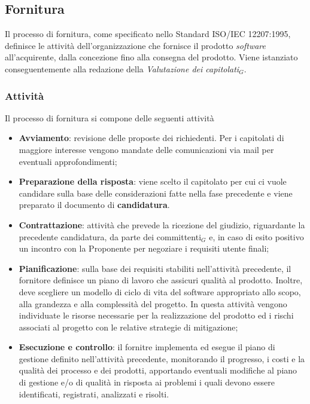 \documentclass[10pt, letterpaper]{article}
\begin{document}
\subsection{Fornitura}
Il processo di fornitura, come specificato nello Standard ISO/IEC 12207:1995, definisce le attività dell'organizzazione che fornisce il prodotto \textit{software} all'acquirente, dalla concezione fino alla consegna del prodotto. Viene istanziato conseguentemente alla redazione della \textit{Valutazione dei \textit{capitolati$_{G}$}}.

\subsubsection{Attività}
Il processo di fornitura si compone delle seguenti attività
\begin{itemize}
    \item \textbf{Avviamento}: revisione delle proposte dei richiedenti. Per i capitolati di maggiore interesse vengono mandate delle comunicazioni via mail per eventuali approfondimenti;

    \item \textbf{Preparazione della risposta}: viene scelto il capitolato per cui ci vuole candidare sulla base delle considerazioni fatte nella fase precedente e viene preparato il documento di \textbf{candidatura}.
    
    \item \textbf{Contrattazione}: attività che prevede la ricezione del giudizio, riguardante la precedente candidatura, da parte dei committenti$_{G}$ e, in 
    caso di esito positivo un incontro con la Proponente per negoziare i requisiti utente finali;
    
    \item \textbf{Pianificazione}: sulla base dei requisiti stabiliti nell'attività precedente, il fornitore definisce un piano di lavoro che assicuri qualità al prodotto. Inoltre, deve scegliere un modello di ciclo di vita del software appropriato allo scopo, alla grandezza e alla complessità del progetto. In questa attività vengono individuate le risorse necessarie per la realizzazione del prodotto ed i rischi associati al progetto con le relative strategie di mitigazione;
    
    \item \textbf{Esecuzione e controllo}: il fornitre implementa ed esegue il piano di gestione definito nell'attività precedente, monitorando il progresso, i costi e la qualità dei processo e dei prodotti, apportando eventuali modifiche al piano di gestione e/o di qualità in risposta ai problemi i quali devono essere identificati, registrati, analizzati e risolti.
    

\end{itemize}
\end{document}
